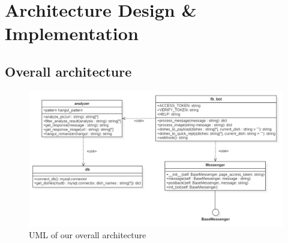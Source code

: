 \section{Architecture Design \& Implementation}
\subsection{Overall architecture}

\begin{figure}[htbp]
\centerline{\includegraphics[width=\linewidth]{./pictures/uml}}
\caption{UML of our overall architecture}
\label{fig:uml}
\end{figure}
\FloatBarrier

